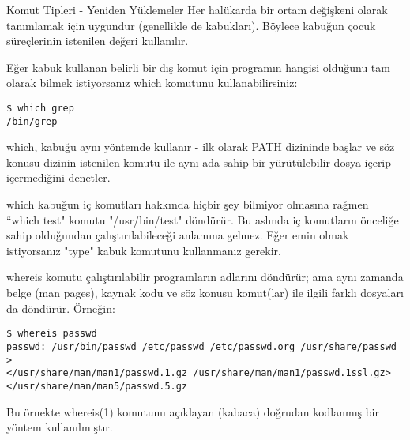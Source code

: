 \begin{section}{Komut Tipleri - Yeniden Yüklemeler}
Her halükarda bir ortam değişkeni olarak tanımlamak için uygundur (genellikle de kabukları). Böylece kabuğun çocuk süreçlerinin istenilen değeri kullanılır.

Eğer kabuk kullanan belirli bir dış komut için programın hangisi olduğunu tam olarak bilmek istiyorsanız which komutunu kullanabilirsiniz:
\begin{verbatim}
$ which grep
/bin/grep
\end{verbatim}

which, kabuğu aynı yöntemde kullanır - ilk olarak PATH dizininde başlar ve söz konusu dizinin istenilen komutu ile aynı ada sahip bir yürütülebilir dosya içerip içermediğini denetler.

which kabuğun iç komutları hakkında hiçbir şey bilmiyor olmasına rağmen “which test" komutu "/usr/bin/test" döndürür. Bu aslında iç komutların önceliğe sahip 	olduğundan çalıştırılabileceği anlamına gelmez. Eğer emin olmak istiyorsanız "type" kabuk komutunu kullanmanız gerekir.

whereis komutu çalıştırılabilir programların adlarını döndürür; ama aynı zamanda belge (man pages), kaynak kodu ve söz konusu komut(lar) ile ilgili farklı dosyaları da döndürür. Örneğin:
\begin{verbatim}
$ whereis passwd
passwd: /usr/bin/passwd /etc/passwd /etc/passwd.org /usr/share/passwd >
</usr/share/man/man1/passwd.1.gz /usr/share/man/man1/passwd.1ssl.gz>
</usr/share/man/man5/passwd.5.gz
\end{verbatim} 

Bu örnekte whereis(1) komutunu açıklayan (kabaca) doğrudan kodlanmış bir yöntem kullanılmıştır.

\end{section}
